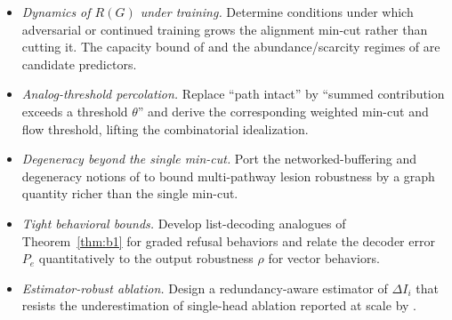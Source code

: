 \begin{itemize}[leftmargin=*,itemsep=2pt,topsep=2pt]
  \item \emph{Dynamics of $R(G)$ under training.} Determine conditions under which
    adversarial or continued training grows the alignment min-cut rather than cutting
    it. The capacity bound of \cite{hanni2024superposition} and the
    abundance/scarcity regimes of \cite{bereska2025superposition} are candidate
    predictors.
  \item \emph{Analog-threshold percolation.} Replace ``path intact'' by ``summed
    contribution exceeds a threshold $\theta$'' and derive the corresponding weighted
    min-cut and flow threshold, lifting the combinatorial idealization.
  \item \emph{Degeneracy beyond the single min-cut.} Port the networked-buffering and
    degeneracy notions of \cite{whitacre2010degeneracy} to bound multi-pathway lesion
    robustness by a graph quantity richer than the single min-cut.
  \item \emph{Tight behavioral bounds.} Develop list-decoding analogues of
    Theorem~\ref{thm:b1} for graded refusal behaviors and relate the decoder error
    $P_e$ quantitatively to the output robustness $\rho$ for vector behaviors.
  \item \emph{Estimator-robust ablation.} Design a redundancy-aware estimator of
    $\Delta I_i$ that resists the underestimation of single-head ablation reported at
    scale by \cite{frank2026routing}.
\end{itemize}
